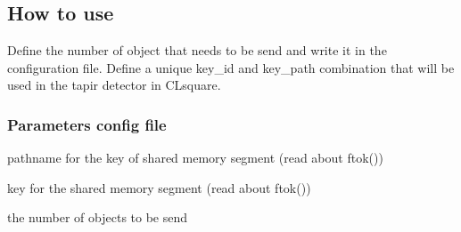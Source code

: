 \subsection{How to use}
\label{sec:mosm:howto}

Define the number of object that needs to be send and write it in the 
configuration file. Define a unique key\_id and key\_path combination 
that will be used in the tapir detector in CLsquare.

\subsubsection{Parameters config file}
\label{sec:mosm:howto:params}

    \begin{description} \itemindent=-15pt
        \item[key\_path] pathname for the key of shared memory segment 
                (read about ftok())
        \item[key\_id] key for the shared memory segment (read about ftok())
        \item[nb\_objects] the number of objects to be send
    \end{description}
